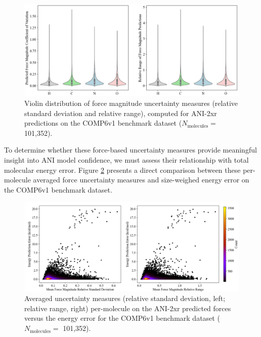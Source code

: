 \begin{figure}[H]
    \centering
    \includegraphics[width=1\linewidth]{Images/2xr_forces/2xr_comp6v1_force-uncertainty_violin.png}
    \caption[Uncertainty in force magnitude predictions: violin distribution (COMP6v1)]{Violin distribution of force magnitude uncertainty measures (relative standard deviation and relative range), computed for ANI-2xr predictions on the COMP6v1 benchmark dataset ($N_\text{molecules}=$ 101,352).}
    \label{fig:2xr_comp6v1-force_uncertainty-violin}
\end{figure}

To determine whether these force-based uncertainty measures provide meaningful insight into ANI model confidence, we must assess their relationship with total molecular energy error. 
Figure \ref{fig:2xr_comp6v1-mean_force_uncertainty_hexbin} presents a direct comparison between these per-molecule averaged force uncertainty measures and size-weighed energy error on the COMP6v1 benchmark dataset. 

\begin{figure}[!ht]
    \centering
    \includegraphics[width=1\linewidth]{Images/2xr_forces/mean-uncertainty-vs-energy.png}
    \caption[Average relative force uncertainty measures per-molecule vs. energy error (COMP6v1)]{Averaged uncertainty measures (relative standard deviation, left; relative range, right) per-molecule on the ANI-2xr predicted forces versus the energy error for the COMP6v1 benchmark dataset ($N_\text{molecules}=$ 101,352).}
    \label{fig:2xr_comp6v1-mean_force_uncertainty_hexbin}
\end{figure}

